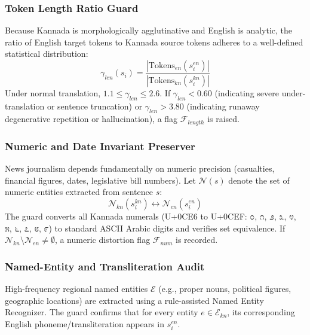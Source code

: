 \documentclass[conference]{IEEEtran}
\begin{document}
\subsubsection{Token Length Ratio Guard}
Because Kannada is morphologically agglutinative and English is analytic, the ratio of English target tokens to Kannada source tokens adheres to a well-defined statistical distribution:
\begin{equation}
    \gamma_{len}(s_i) = \frac{|\text{Tokens}_{en}(s_i^{en})|}{|\text{Tokens}_{kn}(s_i^{kn})|}
    \label{eq:length_ratio}
\end{equation}
Under normal translation, $1.1 \le \gamma_{len} \le 2.6$. If $\gamma_{len} < 0.60$ (indicating severe under-translation or sentence truncation) or $\gamma_{len} > 3.80$ (indicating runaway degenerative repetition or hallucination), a flag $\mathcal{F}_{length}$ is raised.

\subsubsection{Numeric and Date Invariant Preserver}
News journalism depends fundamentally on numeric precision (casualties, financial figures, dates, legislative bill numbers). Let $\mathcal{N}(s)$ denote the set of numeric entities extracted from sentence $s$:
\begin{equation}
    \mathcal{N}_{kn}(s_i^{kn}) \longleftrightarrow \mathcal{N}_{en}(s_i^{en})
    \label{eq:numeric_preservation}
\end{equation}
The guard converts all Kannada numerals (U+0CE6 to U+0CEF: ೦, ೧, ೨, ೩, ೪, ೫, ೬, ೭, ೮, ೯) to standard ASCII Arabic digits and verifies set equivalence. If $\mathcal{N}_{kn} \setminus \mathcal{N}_{en} \ne \emptyset$, a numeric distortion flag $\mathcal{F}_{num}$ is recorded.

\subsubsection{Named-Entity and Transliteration Audit}
High-frequency regional named entities $\mathcal{E}$ (e.g., proper nouns, political figures, geographic locations) are extracted using a rule-assisted Named Entity Recognizer. The guard confirms that for every entity $e \in \mathcal{E}_{kn}$, its corresponding English phoneme/transliteration appears in $s_i^{en}$.
\end{document}
